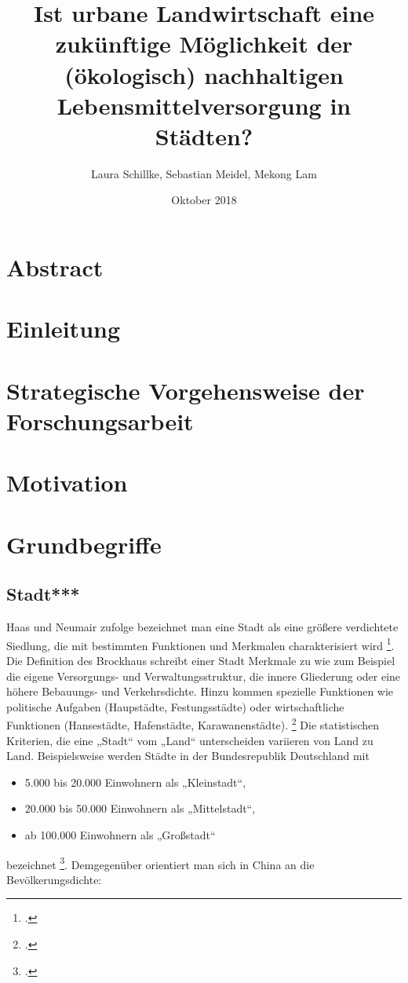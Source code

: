 \documentclass{scrartcl}
\title{Ist urbane Landwirtschaft eine zukünftige Möglichkeit der (ökologisch) nachhaltigen Lebensmittelversorgung in Städten?}
\author{Laura Schillke, Sebastian Meidel, Mekong Lam }
\date{Oktober 2018}
\begin{document}
\maketitle


\newpage

\setcounter{tocdepth}{3}
\tableofcontents 



\newpage

\section{Abstract}

\section{Einleitung}

\section{Strategische Vorgehensweise der Forschungsarbeit}

\section{Motivation}

\section{Grundbegriffe}

\subsection{Stadt***}

Haas und Neumair zufolge bezeichnet man eine Stadt als eine größere verdichtete Siedlung, die mit bestimmten Funktionen und Merkmalen charakterisiert wird \footcite{HaasDefinitionWirtschaftslexikon}. Die Definition des Brockhaus schreibt einer Stadt Merkmale zu wie zum Beispiel die eigene Versorgungs- und Verwaltungsstruktur, die innere Gliederung oder eine höhere Bebauungs- und Verkehrsdichte. Hinzu kommen spezielle Funktionen wie politische Aufgaben (Haupstädte, Festungsstädte) oder wirtschaftliche Funktionen (Hansestädte, Hafenstädte, Karawanenstädte). \footcite{BrockhausStadt} Die statistischen Kriterien, die eine „Stadt“ vom „Land“ unterscheiden variieren von Land zu Land. Beispielsweise werden Städte in der Bundesrepublik Deutschland mit 
\begin{itemize}
\item 5.000 bis 20.000 Einwohnern als „Kleinstadt“,
\item 20.000 bis 50.000 Einwohnern als „Mittelstadt“,
\item ab 100.000 Einwohnern als „Großstadt“ 
\end{itemize}
bezeichnet \footcite{Institutinternationaldestatistique1887BulletinStatistique}. Demgegenüber orientiert man sich in China an die Bevölkerungsdichte: 
\end{document}
